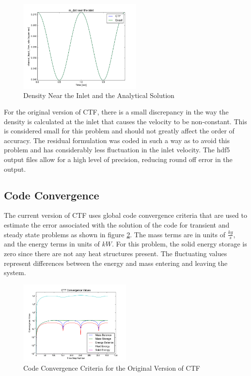 \documentclass{mc2015}
\begin{document}
\begin{figure}[!h]
	\centering
	\includegraphics[width=0.55\textwidth]{images/Code_Verification/run_00_00/residual/results/Inlet_m_dot}
	\caption{Density Near the Inlet and the Analytical Solution}
	\label{fig:Inlet_m_dot}
\end{figure}

 For the original version of CTF, there is a small discrepancy in the way the
 density is calculated at the inlet that causes the velocity to be non-constant.
 This is considered small for this problem and should not greatly affect the
 order of accuracy. The residual formulation was coded in such a way as to avoid
 this problem and has considerably less fluctuation in the inlet velocity. The
 hdf5 output files allow for a high level of precision, reducing
 round off error in the output. 

\subsection{Code Convergence}

The current version of CTF uses global code convergence criteria that are
used to estimate the error associated with the solution of the code for
transient and steady state problems as shown in figure
\ref{fig:Code_Convergence:Original}. The mass terms are in units of
$\frac{kg}{s}$, and the energy terms in units of $kW$. For this problem, the
solid energy storage is zero since there are not any heat structures present.
The fluctuating values represent differences between the energy and mass
entering and leaving the system.

\begin{figure}[!h]
	\centering
	\includegraphics[width=0.50\textwidth]{images/Code_Verification/run_00_00/original/results/Convergence_Plot}
	\caption{Code Convergence Criteria for the Original Version of CTF}
	\label{fig:Code_Convergence:Original}
\end{figure}
\end{document}
